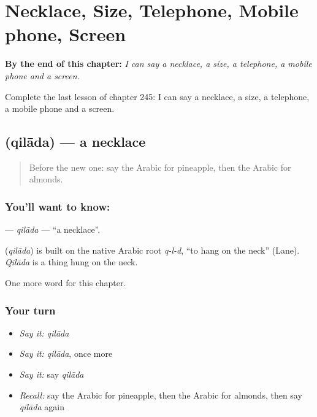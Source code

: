 
\chapter{Necklace, Size, Telephone, Mobile phone, Screen}
\label{ch:ar-necklace-size-telephone-mobile-phone-screen}

\begin{chapteropening}
\textbf{By the end of this chapter:} \emph{I can say a necklace, a size, a telephone, a mobile phone and a screen.}

Complete the last lesson of chapter 245: I can say a necklace, a size, a telephone, a mobile phone and a screen.
\end{chapteropening}

\section[\texorpdfstring{\ar{قلادة} (qilāda)}{قلادة (qilāda)}]{ (qilāda) — a necklace}

\label{lesson:AR-C245-qilada}



\begin{quote}
Before the new one: say the Arabic for pineapple, then the Arabic for almonds.
\end{quote}

\subsection*{You'll want to know: }
\textbf{} — \emph{qilāda} — \textquotedblleft{}a necklace\textquotedblright{}.

\begin{cousinweb}
\textbf{} (\emph{qilāda}) is built on the native Arabic root \emph{q-l-d}, \textquotedblleft{}to hang on the neck\textquotedblright{} (Lane). \emph{Qilāda} is a thing hung on the neck.
\end{cousinweb}

\begin{grammarlens}[title={What you've built}]
One more word for this chapter.
\end{grammarlens}

\subsection*{Your turn}
\begin{itemize}
\raggedright
  \item \emph{Say it:} \emph{qilāda}
  \item \emph{Say it:} \emph{qilāda}, once more
  \item \emph{Say it:} say \emph{qilāda}
  \item \emph{Recall:} say the Arabic for pineapple, then the Arabic for almonds, then say \emph{qilāda} again
\end{itemize}

